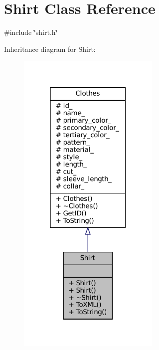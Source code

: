 \hypertarget{classShirt}{}\section{Shirt Class Reference}
\label{classShirt}


{\ttfamily \#include \char`\"{}shirt.\+h\char`\"{}}



Inheritance diagram for Shirt\+:\nopagebreak
\begin{figure}[H]
\begin{center}
\leavevmode
\includegraphics[width=193pt]{classShirt__inherit__graph}
\end{center}
\end{figure}


